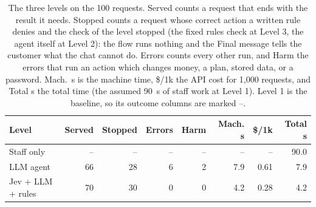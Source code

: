 \begin{table}[t]
\caption{The three levels on the 100 requests. Served counts a request that ends with the result it needs. Stopped counts a request whose correct action a written rule denies and the check of the level stopped (the fixed rules check at Level 3, the agent itself at Level 2): the flow runs nothing and the Final message tells the customer what the chat cannot do. Errors counts every other run, and Harm the errors that run an action which changes money, a plan, stored data, or a password. Mach.~s is the machine time, \$/1k the API cost for 1,000 requests, and Total s the total time (the assumed 90~s of staff work at Level 1). Level 1 is the baseline, so its outcome columns are marked --.}
\label{tab:ladder}
\small
\setlength{\tabcolsep}{1.5pt}
\begin{tabular}{>{\raggedright\arraybackslash}p{1.7cm}rrrrrrr}
\toprule
Level & Served & Stopped & Errors & Harm & Mach. s & \$/1k & Total s \\
\midrule
1 Staff only & -- & -- & -- & -- & -- & -- & 90.0 \\
2 LLM agent & 66 & 28 & 6 & 2 & 7.9 & 0.61 & 7.9 \\
3 Jev + LLM + rules & 70 & 30 & 0 & 0 & 4.2 & 0.28 & 4.2 \\
\bottomrule
\end{tabular}
\end{table}
